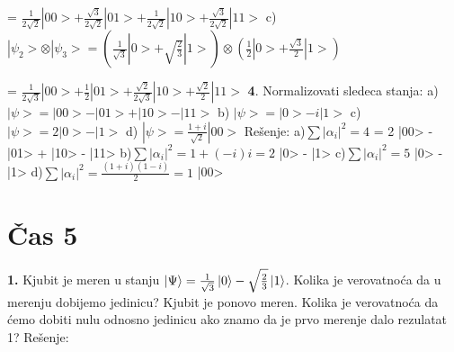 \documentclass{article}
\begin{document}
= $\frac{1}{2\sqrt{2}}|00> + \frac{\sqrt{3}}{2\sqrt{2}}|01> + \frac{1}{2\sqrt{2}}|10> + \frac{\sqrt{3}}{2\sqrt{2}}|11>$
\vspace{0.3cm}\newline
c) $|\psi_2>\otimes|\psi_3> = (\frac{1}{\sqrt{3}}|0>+\sqrt{\frac{2}{3}}|1>)\otimes(\frac{1}{2}|0>+\frac{\sqrt{3}}{2}|1>)$

= $\frac{1}{2\sqrt{3}}|00> + \frac{1}{2}|01> + \frac{\sqrt{2}}{2\sqrt{3}}|10> + \frac{\sqrt{2}}{2}|11>$
\vspace{0.4cm}\newline
\textbf{4}. Normalizovati sledeca stanja: \newline
a) $|\psi> = |00>-|01>+|10>-|11>$ \hspace*{1cm}b) $|\psi> = |0>-i|1>$\newline
c) $|\psi> = 2|0>-|1>$ \hspace*{3.6cm}d) $|\psi> = \frac{1+i}{\sqrt{2}}|00>$
\vspace*{0.4cm}\newline 
Rešenje: \vspace{0.2cm}\newline
a)$\sum|\alpha_i|^2 = 4$ \Rightarrow {} = 2 \Rightarrow {}|00> - |01> + |10> - |11>
\vspace{0.1cm}\newline
b)$\sum|\alpha_i|^2 = 1+(-i)i = 2$ \Rightarrow {} \Rightarrow {}|0> - |1>
\vspace{0.1cm}\newline
c)$\sum|\alpha_i|^2 = 5$ \Rightarrow {} \Rightarrow {}|0> - |1>
\vspace{0.1cm}\newline
d)$\sum|\alpha_i|^2 = \frac{(1+i)(1-i)}{2} = 1$  \Rightarrow {}|00>

\newpage

\section{Čas 5}
\textbf{1.} Kjubit je meren u stanju $\ket{\Psi} = \frac{1}{\sqrt{3}}\ket{0} - \sqrt{\frac{2}{3}}\ket{1}$. Kolika je verovatnoća da u merenju dobijemo jedinicu? Kjubit je ponovo meren. Kolika je verovatnoća da ćemo dobiti nulu odnosno jedinicu ako znamo da je prvo merenje dalo rezulatat 1?
\vspace*{0.4cm}\newline 
Rešenje:\newline
\end{document}
